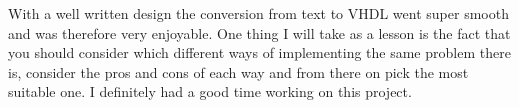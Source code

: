 
With a well written design the conversion from text to VHDL went super smooth and was therefore very enjoyable. One thing I will take as a lesson is the fact that you should consider which different ways of implementing the same problem there is, consider the pros and cons of each way and from there on pick the most suitable one. 
I definitely had a good time working on this project.